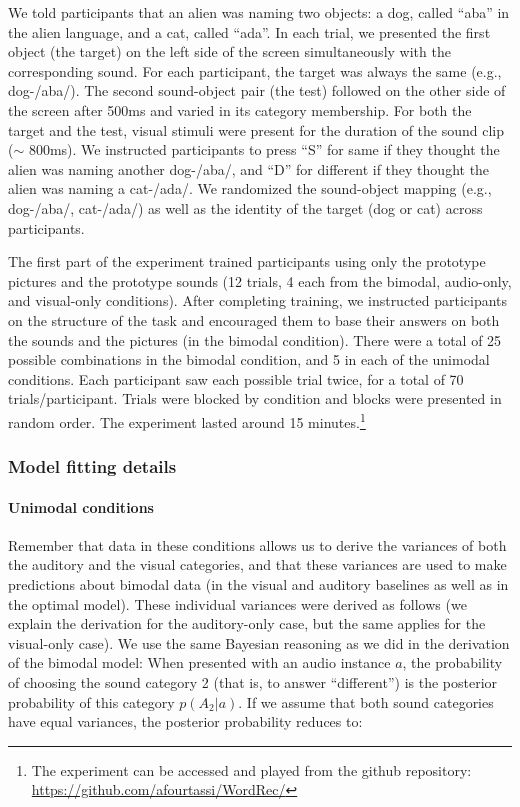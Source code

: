 \documentclass[english,,man,floatsintext]{apa6}
\let\oldparagraph\paragraph
\renewcommand{\paragraph}[1]{\oldparagraph{#1}\mbox{}}
\let\rmarkdownfootnote\footnote%
\def\footnote{\protect\rmarkdownfootnote}
\theoremstyle{definition}
\theoremstyle{definition}
\theoremstyle{definition}
\theoremstyle{remark}
\begin{document}
We told participants that an alien was naming two objects: a dog, called
\enquote{aba} in the alien language, and a cat, called \enquote{ada}. In
each trial, we presented the first object (the target) on the left side
of the screen simultaneously with the corresponding sound. For each
participant, the target was always the same (e.g., dog-/aba/). The
second sound-object pair (the test) followed on the other side of the
screen after 500ms and varied in its category membership. For both the
target and the test, visual stimuli were present for the duration of the
sound clip (\(\sim\) 800ms). We instructed participants to press
\enquote{S} for same if they thought the alien was naming another
dog-/aba/, and \enquote{D} for different if they thought the alien was
naming a cat-/ada/. We randomized the sound-object mapping (e.g.,
dog-/aba/, cat-/ada/) as well as the identity of the target (dog or cat)
across participants.

The first part of the experiment trained participants using only the
prototype pictures and the prototype sounds (12 trials, 4 each from the
bimodal, audio-only, and visual-only conditions). After completing
training, we instructed participants on the structure of the task and
encouraged them to base their answers on both the sounds and the
pictures (in the bimodal condition). There were a total of 25 possible
combinations in the bimodal condition, and 5 in each of the unimodal
conditions. Each participant saw each possible trial twice, for a total
of 70 trials/participant. Trials were blocked by condition and blocks
were presented in random order. The experiment lasted around 15
minutes.\footnote{The experiment can be accessed and played from the
  github repository: \url{https://github.com/afourtassi/WordRec/}}

\subsubsection{Model fitting details}\label{model-fitting-details}

\paragraph{Unimodal conditions}\label{unimodal-conditions}

Remember that data in these conditions allows us to derive the variances
of both the auditory and the visual categories, and that these variances
are used to make predictions about bimodal data (in the visual and
auditory baselines as well as in the optimal model). These individual
variances were derived as follows (we explain the derivation for the
auditory-only case, but the same applies for the visual-only case). We
use the same Bayesian reasoning as we did in the derivation of the
bimodal model: When presented with an audio instance \(a\), the
probability of choosing the sound category 2 (that is, to answer
\enquote{different}) is the posterior probability of this category
\(p(A_2|a)\). If we assume that both sound categories have equal
variances, the posterior probability reduces to:
\end{document}
